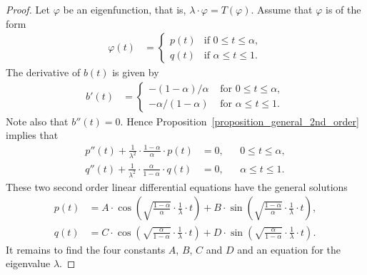 \documentclass[11pt,reqno]{amsart}
\theoremstyle{definition}
\numberwithin{equation}{section}
\begin{document}
\begin{proof}
Let $\varphi$ be an eigenfunction,
that is, $\lambda \cdot \varphi = T(\varphi)$.
Assume that $\varphi$ is of the form
\begin{align*}
\varphi(t)
& =
\begin{cases}
p(t) & \text{if } 0 \leq t \leq \alpha , \\
q(t) & \text{if } \alpha \leq t \leq 1 .
\end{cases}
\end{align*}
The derivative of $b(t)$ is given by
\begin{align*}
b'(t)
& = 
\begin{cases}
-(1-\alpha)/\alpha & \text{ for } 0 \leq t \leq \alpha, \\
-\alpha/(1-\alpha) & \text{ for } \alpha \leq t \leq 1 .
\end{cases}
\end{align*}
Note also that $b''(t) = 0$.
Hence Proposition~\ref{proposition_general_2nd_order}
implies that
\begin{align*}
p''(t) 
+
\frac{1}{\lambda^{2}} \cdot \frac{1-\alpha}{\alpha} \cdot p(t) 
& =
0 ,
&&
0 \leq t \leq \alpha,
\\
q''(t)
+
\frac{1}{\lambda^{2}} \cdot \frac{\alpha}{1-\alpha} \cdot q(t) 
& =
0 ,
&&
\alpha \leq t \leq 1.
\end{align*}
These two second order linear differential equations
have the general solutions
\begin{align}
p(t)
& =
A \cdot \cos\left( \sqrt{\frac{1-\alpha}{\alpha}} \cdot \frac{1}{\lambda} \cdot  t \right)
+
B \cdot \sin\left( \sqrt{\frac{1-\alpha}{\alpha}} \cdot \frac{1}{\lambda} \cdot t \right) ,
\label{equation_p_explicit_A_B}
\\
q(t)
& =
C \cdot \cos\left( \sqrt{\frac{\alpha}{1-\alpha}} \cdot \frac{1}{\lambda} \cdot  t \right)
+
D \cdot \sin\left( \sqrt{\frac{\alpha}{1-\alpha}} \cdot \frac{1}{\lambda} \cdot t \right) .
\label{equation_q_explicit_C_D}
\end{align}
It remains to find the four constants $A$, $B$, $C$ and $D$
and an equation for the eigenvalue $\lambda$.


\end{proof}
\end{document}
